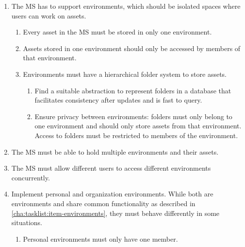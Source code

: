 \begin{enumerate}
	\item The MS has to support environments, which should be isolated spaces where users can work on
	      assets. \label{cha:tasklist:item-environments}
	      \begin{enumerate}
		      \item Every asset in the MS must be stored in only one environment.

		      \item Assets stored in one environment should only be accessed by members of that
		            environment.

		      \item Environments must have a hierarchical folder system to store assets.
		            \begin{enumerate}
			            \item Find a suitable abstraction to represent folders in a database
			                  that facilitates consistency after updates and is fast to query.

			            \item Ensure privacy between environments: folders must only belong to
			                  one environment and should only store assets from that environment.
			                  Access to folders must be restricted to members of the environment.


		            \end{enumerate}


	      \end{enumerate}

	\item The MS must be able to hold multiple environments and their assets.

	\item The MS must allow different users to access different environments concurrently.

	\item Implement personal and organization environments. While both are environments
	      and share common functionality as described in
	      \ref{cha:tasklist:item-environments}, they must behave differently in some
	      situations.
	      \begin{enumerate}
		      \item Personal environments must only have one member.


\end{enumerate}
\end{enumerate}
